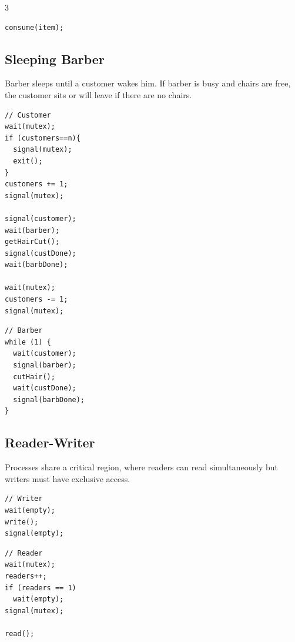 \documentclass[12pt, a4paper]{article}
\begin{document}
\begin{multicols*}{3}
\begin{minipage}{0.5\columnwidth}
\begin{lstlisting}
consume(item);
  \end{lstlisting}
\end{minipage}

\subsection{Sleeping Barber}
Barber sleeps until a customer wakes him. If barber is busy and chairs are free, the customer sits or will leave if there are no chairs.

\begin{minipage}{0.48\columnwidth}
  \begin{lstlisting}
// Customer
wait(mutex);
if (customers==n){
  signal(mutex);
  exit();
}
customers += 1;
signal(mutex);

signal(customer);
wait(barber);
getHairCut();
signal(custDone);
wait(barbDone);

wait(mutex);
customers -= 1;
signal(mutex);
  \end{lstlisting}
\end{minipage}
\begin{minipage}{0.48\columnwidth}
  \begin{lstlisting}
// Barber
while (1) {
  wait(customer);
  signal(barber);
  cutHair();
  wait(custDone);
  signal(barbDone);
}
  \end{lstlisting}
\end{minipage}


\colbreak
\subsection{Reader-Writer}
Processes share a critical region, where readers can read simultaneously but writers must have exclusive access.
\vspace{-1em}
\begin{minipage}{0.45\columnwidth}
  \begin{lstlisting}
// Writer
wait(empty);
write();
signal(empty);
  \end{lstlisting}
\end{minipage}
\begin{minipage}{0.5\columnwidth}
  \begin{lstlisting}
// Reader 
wait(mutex);
readers++;
if (readers == 1)
  wait(empty);
signal(mutex);

read();


\end{lstlisting}
\end{minipage}
\end{multicols*}
\end{document}

